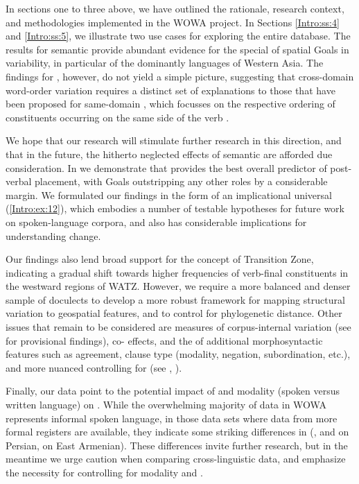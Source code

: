 \documentclass[output=paper,colorlinks,citecolor=brown,collectionchapter]{langscibook}
\begin{document}
In sections one to three above, we have outlined the rationale, research context, and methodologies implemented in the WOWA project. In Sections \ref{Intro:ss:4} and \ref{Intro:ss:5}, we illustrate two use cases for exploring the entire database. The results for semantic  provide abundant evidence for the special  of spatial Goals in  variability, in particular of the dominantly  languages of Western Asia. The findings for , however, do not yield a simple picture, suggesting that cross-domain word-order variation \citep{yao_np_2018} requires a distinct set of explanations to those that have been proposed for same-domain , which focusses on the respective ordering of constituents occurring on the same side of the verb \citep{wasow_factors_2022}. 

We hope that our research will stimulate further research in this direction, and that in the future, the hitherto neglected effects of semantic  are afforded due consideration. In  we demonstrate that  provides the best overall predictor of post-verbal placement, with Goals outstripping any other roles by a considerable margin. We formulated our findings in the form of an implicational universal (\ref{Intro:ex:12}), which embodies a number of testable hypotheses for future work on spoken-language corpora, and also has considerable implications for understanding  change.

Our findings also lend broad support for the concept of Transition Zone, indicating a gradual shift towards higher frequencies of verb-final constituents in the westward regions of WATZ. However, we require a more balanced and denser sample of doculects to develop a more robust framework for mapping structural variation to geospatial features, and to control for phylogenetic distance. Other issues that remain to be considered are measures of corpus-internal variation (see \citealt{craevschi_historical_2022} for provisional findings), co- effects, and the  of additional morphosyntactic features such as agreement, clause type (modality, negation, subordination, etc.), and more nuanced controlling for  (see , ).

Finally, our data point to the potential impact of  and modality (spoken versus written language) on . While the overwhelming majority of data in WOWA represents informal spoken language, in those data sets where data from more formal registers are available, they indicate some striking differences in  (\citealt{chapters/4_NourzaeiHaig_Balochi},  and  on Persian, \citealt{chapters/13_Hodgsonetal_Armenian} on East Armenian). These differences invite further research, but in the meantime we urge caution when comparing cross-linguistic data, and emphasize the necessity for controlling for modality and .
\end{document}
